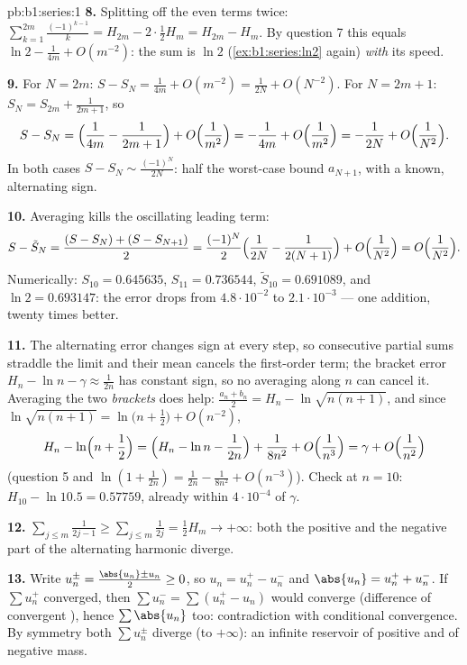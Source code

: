 \begin{solution}{pb:b1:series:1}
\textbf{8.} Splitting off the even terms twice:
$\sum_{k=1}^{2m}\frac{(-1)^{k-1}}{k} = H_{2m} - 2\cdot\frac12
H_m = H_{2m} - H_m$. By question 7 this equals $\ln 2 -
\frac{1}{4m} + O(m^{-2})$: the sum is $\ln 2$
(\cref{ex:b1:series:ln2} again) \emph{with} its speed.

\textbf{9.} For $N = 2m$: $S - S_N = \frac{1}{4m} + O(m^{-2}) =
\frac{1}{2N} + O(N^{-2})$. For $N = 2m + 1$: $S_{N} = S_{2m} +
\frac{1}{2m+1}$, so
\[
S - S_N = \Bigl(\frac{1}{4m} - \frac{1}{2m+1}\Bigr) +
O\Bigl(\frac{1}{m^2}\Bigr)
= -\frac{1}{4m} + O\Bigl(\frac{1}{m^2}\Bigr)
= -\frac{1}{2N} + O\Bigl(\frac{1}{N^2}\Bigr).
\]
In both cases $S - S_N \sim \frac{(-1)^N}{2N}$: half the
worst-case bound $a_{N+1}$, with a known, alternating sign.

\textbf{10.} Averaging kills the oscillating leading term:
\[
S - \tilde S_N = \frac{(S - S_N) + (S - S_{N+1})}{2}
= \frac{(-1)^N}{2}\Bigl(\frac{1}{2N} - \frac{1}{2(N+1)}\Bigr)
+ O\Bigl(\frac{1}{N^2}\Bigr) = O\Bigl(\frac{1}{N^2}\Bigr).
\]
Numerically: $S_{10} = 0.645635$, $S_{11} = 0.736544$, $\tilde
S_{10} = 0.691089$, and $\ln 2 = 0.693147$: the error drops from
$4.8\cdot10^{-2}$ to $2.1\cdot10^{-3}$ --- one addition, twenty
times better.

\textbf{11.} The alternating error changes sign at every step,
so consecutive partial sums straddle the limit and their mean
cancels the first-order term; the bracket error $H_n - \ln n -
\gamma \approx \frac{1}{2n}$ has constant sign, so no averaging
along $n$ can cancel it. Averaging the two \emph{brackets} does
help: $\frac{a_n + b_n}{2} = H_n - \ln\sqrt{n(n+1)}$, and since
$\ln\sqrt{n(n+1)} = \ln\bigl(n + \frac12\bigr) + O(n^{-2})$,
\[
H_n - \ln\Bigl(n + \frac12\Bigr)
= \Bigl(H_n - \ln n - \frac{1}{2n}\Bigr) + \frac{1}{8n^2} +
O\Bigl(\frac{1}{n^3}\Bigr) = \gamma + O\Bigl(\frac{1}{n^2}\Bigr)
\]
(question 5 and $\ln(1 + \frac{1}{2n}) = \frac{1}{2n} -
\frac{1}{8n^2} + O(n^{-3})$). Check at $n = 10$: $H_{10} -
\ln 10.5 = 0.57759$, already within $4\cdot10^{-4}$ of
$\gamma$.

\textbf{12.} $\sum_{j\leq m} \frac{1}{2j-1} \geq \sum_{j \leq m}
\frac{1}{2j} = \frac12 H_m \to +\infty$: both the positive and
the negative part of the alternating harmonic  diverge.

\textbf{13.} Write $u_n^\pm = \frac{\abs{u_n} \pm u_n}{2} \geq
0$, so $u_n = u_n^+ - u_n^-$ and $\abs{u_n} = u_n^+ + u_n^-$. If
$\sum u_n^+$ converged, then $\sum u_n^- = \sum (u_n^+ - u_n)$
would converge (difference of convergent ), hence $\sum
\abs{u_n}$ too: contradiction with conditional convergence. By
symmetry both $\sum u_n^\pm$ diverge (to $+\infty$): an infinite
reservoir of positive and of negative mass.


\end{solution}
